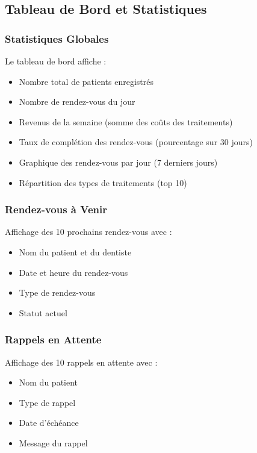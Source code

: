 \documentclass[12pt,a4paper]{report}
\begin{document}
\subsection{Tableau de Bord et Statistiques}

\subsubsection{Statistiques Globales}

Le tableau de bord affiche :
\begin{itemize}
    \item Nombre total de patients enregistrés
    \item Nombre de rendez-vous du jour
    \item Revenus de la semaine (somme des coûts des traitements)
    \item Taux de complétion des rendez-vous (pourcentage sur 30 jours)
    \item Graphique des rendez-vous par jour (7 derniers jours)
    \item Répartition des types de traitements (top 10)
\end{itemize}

\subsubsection{Rendez-vous à Venir}

Affichage des 10 prochains rendez-vous avec :
\begin{itemize}
    \item Nom du patient et du dentiste
    \item Date et heure du rendez-vous
    \item Type de rendez-vous
    \item Statut actuel
\end{itemize}

\subsubsection{Rappels en Attente}

Affichage des 10 rappels en attente avec :
\begin{itemize}
    \item Nom du patient
    \item Type de rappel
    \item Date d'échéance
    \item Message du rappel
\end{itemize}
\end{document}
